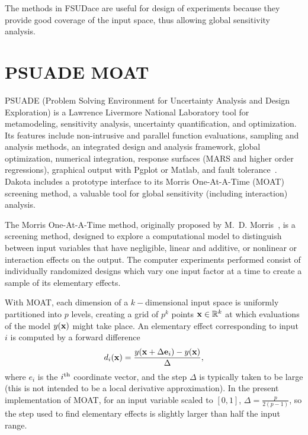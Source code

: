 The methods in FSUDace are useful for design of experiments because 
they provide good coverage of the input space, thus allowing global 
sensitivity analysis. 

\section{PSUADE MOAT}\label{dace:psuade}

PSUADE (Problem Solving Environment for Uncertainty Analysis and
Design Exploration) is a Lawrence Livermore National Laboratory tool
for metamodeling, sensitivity analysis, uncertainty quantification,
and optimization. Its features include non-intrusive and parallel
function evaluations, sampling and analysis methods, an integrated
design and analysis framework, global optimization, numerical
integration, response surfaces (MARS and higher order regressions),
graphical output with Pgplot or Matlab, and fault
tolerance~\cite{Ton05}. Dakota includes a prototype interface to its
Morris One-At-A-Time (MOAT) screening method, a valuable tool for
global sensitivity (including interaction) analysis.

The Morris One-At-A-Time method, originally proposed by
M.~D. Morris~\cite{Mor91}, is a screening method, designed to explore
a computational model to distinguish between input variables that have
negligible, linear and additive, or nonlinear or interaction effects
on the output. The computer experiments performed consist of
individually randomized designs which vary one input factor at a time
to create a sample of its elementary effects.

With MOAT, each dimension of a $k-$dimensional input space is
uniformly partitioned into $p$ levels, creating a grid of $p^k$ points
${\bf x} \in \mathbb{R}^k$ at which evaluations of the model $y({\bf
x})$ might take place. An elementary effect corresponding to input
$i$ is computed by a forward difference
\begin{equation}
d_i({\bf x}) = \frac{y({\bf x} + \Delta {\bf e}_i) - y({\bf x})}{\Delta},
\end{equation}
where $e_i$ is the $i^{\mbox{\scriptsize th}}$ coordinate vector, and
the step $\Delta$ is typically taken to be large (this is not intended
to be a local derivative approximation). In the present
implementation of MOAT, for an input variable scaled to $[0,1]$,
$\Delta = \frac{p}{2(p-1)}$, so the step used to find elementary
effects is slightly larger than half the input range.

